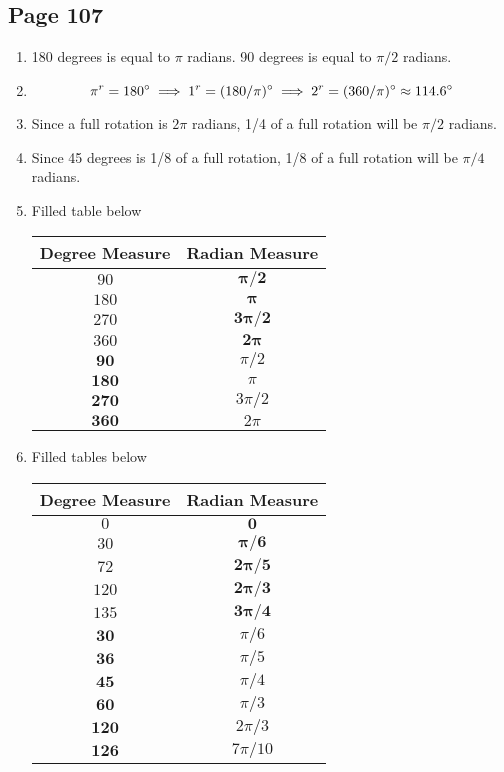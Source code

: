 \documentclass{article}
\newenvironment{solutions}[1]
{\subsection*{#1}
 \begin{enumerate}[leftmargin=1.5em]}
{\end{enumerate}}
\newcommand{\solution}{\item}
\begin{document}
\begin{solutions}{Page 107}
\solution %
180 degrees is equal to $\pi$ radians. 90 degrees is equal to $\pi/2$ radians.

\solution %
\[
\pi^r = 180\degree \implies 1^r = (180/\pi)\degree \implies 2^r = (360/\pi)\degree \approx 114.6\degree
\]

\solution %
Since a full rotation is $2\pi$ radians, 1/4 of a full rotation will be $\pi/2$ radians.

\solution %
Since 45 degrees is 1/8 of a full rotation, 1/8 of a full rotation will be $\pi/4$ radians.

\solution %
Filled table below

\begin{center}
\bgroup
\def\arraystretch{1.1}
\setlength\tabcolsep{10pt}
\begin{tabular}{ |c|c| }
\hline
Degree Measure
& Radian Measure\\
\hline
$90$
& $\mathbf{\pi / 2}$\\
\hline
$180$
& $\mathbf{\pi}$\\
\hline
$270$
& $\mathbf{3\pi / 2}$\\
\hline
$360$
& $\mathbf{2\pi}$\\
\hline
$\mathbf{90}$
& $\pi / 2$\\
\hline
$\mathbf{180}$
& $\pi$\\
\hline
$\mathbf{270}$
& $3\pi / 2$\\
\hline
$\mathbf{360}$
& $2\pi$\\
\hline
\end{tabular}
\egroup
\end{center}

\solution %
Filled tables below

\begin{center}
\bgroup
\def\arraystretch{1.1}
\setlength\tabcolsep{10pt}
\begin{tabular}{ |c|c| }
\hline
Degree Measure
& Radian Measure\\
\hline
$0$
& $\mathbf{0}$\\
\hline
$30$
& $\mathbf{\pi/6}$\\
\hline
$72$
& $\mathbf{2\pi / 5}$\\
\hline
$120$
& $\mathbf{2\pi/3}$\\
\hline
$135$
& $\mathbf{3\pi / 4}$\\
\hline
$\mathbf{30}$
& $\pi/6$\\
\hline
$\mathbf{36}$
& $\pi / 5$\\
\hline
$\mathbf{45}$
& $\pi/4$\\
\hline
$\mathbf{60}$
& $\pi/3$\\
\hline
$\mathbf{120}$
& $2\pi/3$\\
\hline
$\mathbf{126}$
& $7\pi/10$\\
\hline
\end{tabular}
\egroup
\end{center}


\end{solutions}
\end{document}
